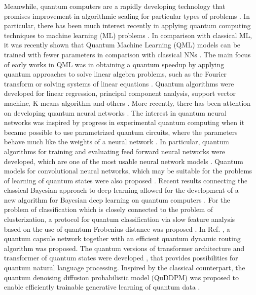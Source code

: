 \documentclass[%
  pra, aps, physrev,
  showkeys,
  twocolumn,
  showpacs,
  superscriptaddress,
  amsmath,amssymb,
  10pt
]{revtex4-2}
\begin{document}
Meanwhile, quantum computers are a rapidly developing technology that promises improvement in algorithmic scaling for particular types of problems \cite{nielsen2010quantum,Cerezo2021,Bharti2022,byrnes2021quantum}.
In particular, there has been much interest recently in applying quantum computing techniques to machine learning (ML) problems \cite{dunjko2018, biamonte2017, schuld2014, carleo2019, Benedetti2019, Cerezo2022, Sajjan2022}. In comparison with classical ML, it was recently shown that Quantum Machine Learning (QML) models can be trained with fewer parameters in comparison with classical NNs \cite{abbasPowerQuantumNeural2021,caroGeneralizationQuantumMachine2022}.
The main focus of early works in QML was in obtaining a quantum speedup \cite{biamonte2017, schuld2014} by applying quantum approaches to solve linear algebra problems, such as the Fourier transform or solving systems of linear equations \cite{wiebe2012,harrow2009,childs2017}.
Quantum algorithms were developed for  linear regression, principal component analysis, support vector machine, K-means algorithm and others \cite{lloyd2013,lloyd2014,dunjko2016,paparo2014,rebentrost2014}.
More recently, there has been attention on developing quantum neural networks \cite{kamruzzaman2019, schuld2014b, jeswal2019, broughton2020}.
The interest in quantum neural networks was inspired by progress in experimental quantum computing when it became possible to use parametrized quantum circuits,
where the parameters behave much like the weights of a neural network \cite{lewenstein1994,Benedetti2019}.
In particular, quantum algorithms for training and evaluating feed forward neural networks were developed,
which are one of the most usable neural network models \cite{allcock2018, tacchino2019}. Quantum models for convolutional neural networks, which may be suitable for the problems of learning of quantum states were also proposed \cite{cong2019, liu2019}. Recent results connecting the classical Bayesian approach to deep learning allowed for the development of a new algorithm for Bayesian deep learning on quantum computers \cite{zhao2019,daiQuantumBayesianOptimization2023}. For the problem of classification which is closely connected to the problem of clusterization, a protocol for quantum classification via slow feature analysis based on the use of quantum Frobenius distance was proposed \cite{kerenidis2018}.
In Ref.  \cite{Liu2022}, a quantum capsule network together with an efficient quantum dynamic routing algorithm was proposed.
The quantum versions of transformer architecture and transformer of quantum states were developed \cite{Viteritti2023,cherratQuantumVisionTransformers2024,khatriQuixerQuantumTransformer2024,zhangTransformerQuantumState2023}, that provides possibilities for quantum natural language processing. Inspired by the classical counterpart, the quantum denoising diffusion probabilistic model (QuDDPM) was proposed to enable efficiently trainable generative learning of quantum data \cite{zhangGenerativeQuantumMachine2024}.
\end{document}
